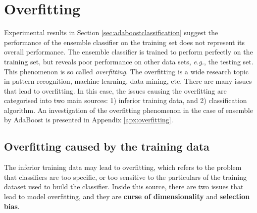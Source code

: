 \section{Overfitting}
\label{sec:overfitting}
Experimental results in \mbox{Section} \ref{sec:adaboostclassification} suggest the performance of the ensemble classifier on the training set does not represent its overall performance. The ensemble classifier is trained to perform perfectly on the training set, but reveals poor performance on other data sets, \textit{e.g.}, the testing set. This phenomenon is so called \textit{overfitting}. The overfitting is a wide research topic in pattern recognition, machine learning, data mining, etc. There are many issues that lead to overfitting. In this case, the issues causing the overfitting are categorised into two main sources: 1) inferior training data, and 2) classification algorithm. An investigation of the overfitting phenomenon in the case of ensemble by AdaBoost is presented in \mbox{Appendix} \ref{apx:overfitting}.

\subsection{Overfitting caused by the training data}
The inferior training data may lead to overfitting, which refers to the problem that classifiers are too specific, or too sensitive to the particulars of the training dataset used to build the classifier. Inside this source, there are two issues that lead to model overfitting, and they are \textbf{curse of dimensionality} and \textbf{selection bias}.

